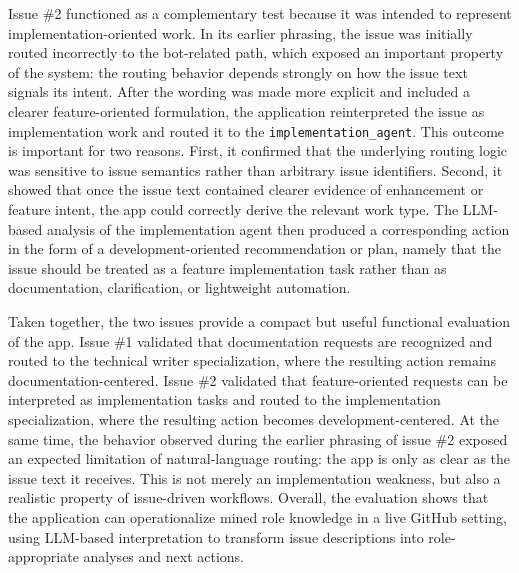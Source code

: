 \documentclass[11pt,a4paper]{article}
\begin{document}
Issue \#2 functioned as a complementary test because it was intended to represent implementation-oriented work. In its earlier phrasing, the issue was initially routed incorrectly to the bot-related path, which exposed an important property of the system: the routing behavior depends strongly on how the issue text signals its intent. After the wording was made more explicit and included a clearer feature-oriented formulation, the application reinterpreted the issue as implementation work and routed it to the \texttt{implementation\_agent}. This outcome is important for two reasons. First, it confirmed that the underlying routing logic was sensitive to issue semantics rather than arbitrary issue identifiers. Second, it showed that once the issue text contained clearer evidence of enhancement or feature intent, the app could correctly derive the relevant work type. The LLM-based analysis of the implementation agent then produced a corresponding action in the form of a development-oriented recommendation or plan, namely that the issue should be treated as a feature implementation task rather than as documentation, clarification, or lightweight automation.

Taken together, the two issues provide a compact but useful functional evaluation of the app. Issue \#1 validated that documentation requests are recognized and routed to the technical writer specialization, where the resulting action remains documentation-centered. Issue \#2 validated that feature-oriented requests can be interpreted as implementation tasks and routed to the implementation specialization, where the resulting action becomes development-centered. At the same time, the behavior observed during the earlier phrasing of issue \#2 exposed an expected limitation of natural-language routing: the app is only as clear as the issue text it receives. This is not merely an implementation weakness, but also a realistic property of issue-driven workflows. Overall, the evaluation shows that the application can operationalize mined role knowledge in a live GitHub setting, using LLM-based interpretation to transform issue descriptions into role-appropriate analyses and next actions.
\end{document}
